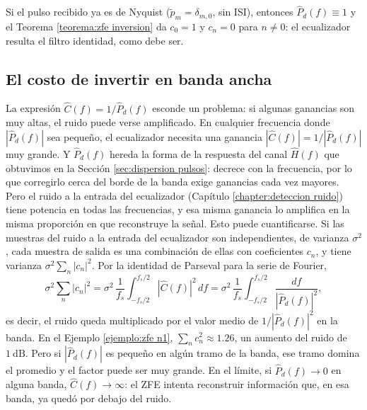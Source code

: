 \begin{remark}
Si el pulso recibido ya es de Nyquist ($\tilde p_m=\delta_{m,0}$, sin ISI), entonces $\hat P_d(f)\equiv 1$ y el Teorema \ref{teorema:zfe inversion} da $c_0=1$ y $c_n=0$ para $n\neq 0$: el ecualizador resulta el filtro identidad, como debe ser.
\end{remark}

\subsection*{El costo de invertir en banda ancha}

La expresión $\hat C(f)=1/\hat P_d(f)$ esconde un problema: si algunas ganancias son muy altas, el ruido puede verse amplificado. En cualquier frecuencia donde $|\hat P_d(f)|$ sea pequeño, el ecualizador necesita una ganancia $|\hat C(f)|=1/|\hat P_d(f)|$ muy grande. Y $\hat P_d(f)$ hereda la forma de la respuesta del canal $\hat H(f)$ que obtuvimos en la Sección \ref{sec:dispersion pulsos}: decrece con la frecuencia, por lo que corregirlo cerca del borde de la banda exige ganancias cada vez mayores. Pero el ruido a la entrada del ecualizador (Capítulo \ref{chapter:deteccion ruido}) tiene potencia en todas las frecuencias, y esa misma ganancia lo amplifica en la misma proporción en que reconstruye la señal. Esto puede cuantificarse. Si las muestras del ruido a la entrada del ecualizador son independientes, de varianza $\sigma^2$, cada muestra de salida es una combinación de ellas con coeficientes $c_n$, y tiene varianza $\sigma^2\sum_n|c_n|^2$. Por la identidad de Parseval para la serie de Fourier,
\begin{equation*}
    \sigma^2\sum_n|c_n|^2 = \sigma^2\,\frac{1}{f_s}\int_{-f_s/2}^{f_s/2}|\hat C(f)|^2\,df = \sigma^2\,\frac{1}{f_s}\int_{-f_s/2}^{f_s/2}\frac{df}{|\hat P_d(f)|^2},
\end{equation*}
es decir, el ruido queda multiplicado por el valor medio de $1/|\hat P_d(f)|^2$ en la banda. En el Ejemplo \ref{ejemplo:zfe n1}, $\sum_n c_n^2\approx 1.26$, un aumento del ruido de $1\ \unit{\deci\bel}$. Pero si $|\hat P_d(f)|$ es pequeño en algún tramo de la banda, ese tramo domina el promedio y el factor puede ser muy grande. En el límite, si $\hat P_d(f)\to 0$ en alguna banda, $\hat C(f)\to\infty$: el ZFE intenta reconstruir información que, en esa banda, ya quedó por debajo del ruido.


